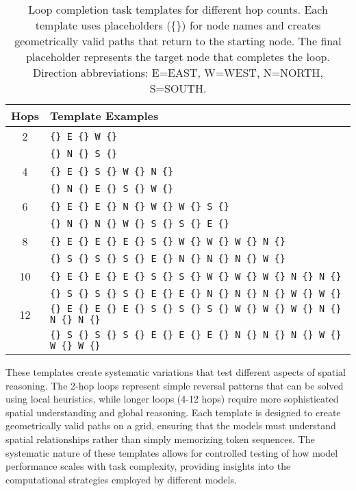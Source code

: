 \begin{table}[H]
\centering
\caption[Loop completion task templates]{Loop completion task templates for different hop counts. Each template uses placeholders (\{\}) for node names and creates geometrically valid paths that return to the starting node. The final placeholder represents the target node that completes the loop. Direction abbreviations: E=EAST, W=WEST, N=NORTH, S=SOUTH.}
\label{tab:loop_templates}
\small
\begin{tabular}{cl}
\hline
\textbf{Hops} & \textbf{Template Examples} \\
\hline
2 & \texttt{\{\} E \{\} W \{\}} \\
  & \texttt{\{\} N \{\} S \{\}} \\
\hline
4 & \texttt{\{\} E \{\} S \{\} W \{\} N \{\}} \\
  & \texttt{\{\} N \{\} E \{\} S \{\} W \{\}} \\
\hline
6 & \texttt{\{\} E \{\} E \{\} N \{\} W \{\} W \{\} S \{\}} \\
  & \texttt{\{\} N \{\} N \{\} W \{\} S \{\} S \{\} E \{\}} \\
\hline
8 & \texttt{\{\} E \{\} E \{\} E \{\} S \{\} W \{\} W \{\} W \{\} N \{\}} \\
  & \texttt{\{\} S \{\} S \{\} S \{\} E \{\} N \{\} N \{\} N \{\} W \{\}} \\
\hline
10 & \texttt{\{\} E \{\} E \{\} E \{\} S \{\} S \{\} W \{\} W \{\} W \{\} N \{\} N \{\}} \\
  & \texttt{\{\} S \{\} S \{\} S \{\} E \{\} E \{\} N \{\} N \{\} N \{\} W \{\} W \{\}} \\
\hline
12 & \texttt{\{\} E \{\} E \{\} E \{\} S \{\} S \{\} S \{\} W \{\} W \{\} W \{\} N \{\} N \{\} N \{\}} \\
  & \texttt{\{\} S \{\} S \{\} S \{\} E \{\} E \{\} E \{\} N \{\} N \{\} N \{\} W \{\} W \{\} W \{\}} \\
\hline
\end{tabular}
\end{table}

These templates create systematic variations that test different aspects of spatial reasoning. The 2-hop loops represent simple reversal patterns that can be solved using local heuristics, while longer loops (4-12 hops) require more sophisticated spatial understanding and global reasoning. Each template is designed to create geometrically valid paths on a grid, ensuring that the models must understand spatial relationships rather than simply memorizing token sequences. The systematic nature of these templates allows for controlled testing of how model performance scales with task complexity, providing insights into the computational strategies employed by different models.


